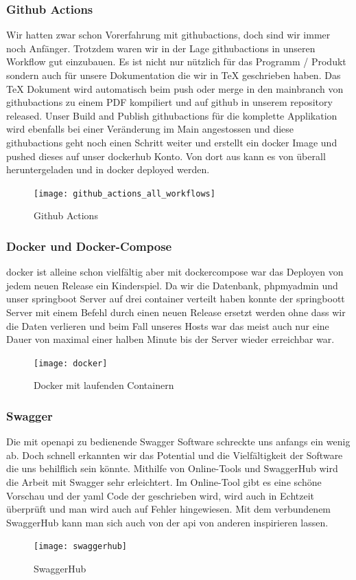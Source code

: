 \documentclass[../main.tex]{subfiles}
\begin{document}
	\subsubsection{Github Actions}
	Wir hatten zwar schon Vorerfahrung mit \gls{githubactions}, doch sind wir immer noch Anfänger. Trotzdem waren wir in der Lage \gls{githubactions} in unseren Workflow gut einzubauen. Es ist nicht nur nützlich für das Programm / Produkt sondern auch für unsere Dokumentation die wir in TeX geschrieben haben. Das TeX Dokument wird automatisch beim \gls{push} oder \gls{merge} in den \gls{mainbranch} von \gls{githubactions} zu einem PDF kompiliert und auf \gls{github} in unserem \gls{repository} released. Unser Build and Publish \gls{githubactions} für die komplette Applikation wird ebenfalls bei einer Veränderung im Main angestossen und diese \gls{githubactions} geht noch einen Schritt weiter und erstellt ein \gls{docker} Image und pushed dieses auf unser \gls{dockerhub} Konto. Von dort aus kann es von überall heruntergeladen und in \gls{docker} deployed werden.
	\begin{figure}[H]
		\centering
		\texttt{[image: github\_actions\_all\_workflows]} 
		\caption{Github Actions}
		\label{fig:github_actions_all_workflows}
	\end{figure}
	
	\subsubsection{Docker und Docker-Compose}
	\gls{docker} ist alleine schon vielfältig aber mit \gls{dockercompose} war das Deployen von jedem neuen Release ein Kinderspiel. Da wir die Datenbank, \gls{phpmyadmin} und unser \gls{springboot} Server auf drei \gls{container} verteilt haben konnte der \gls{springboot}t Server mit einem Befehl durch einen neuen Release ersetzt werden ohne dass wir die Daten verlieren und beim Fall unseres Hosts war das meist auch nur eine Dauer von maximal einer halben Minute bis der Server wieder erreichbar war.
	\begin{figure}[H]
		\centering
		\texttt{[image: docker]} 
		\caption{Docker mit laufenden Containern}
		\label{fig:docker}
	\end{figure}
	
	\subsubsection{Swagger}
	Die mit \gls{openapi} zu bedienende Swagger Software schreckte uns anfangs ein wenig ab. Doch schnell erkannten wir das Potential und die Vielfältigkeit der Software die uns behilflich sein könnte. Mithilfe von Online-Tools und SwaggerHub wird die Arbeit mit Swagger sehr erleichtert. Im Online-Tool gibt es eine schöne Vorschau und der \gls{yaml} Code der geschrieben wird, wird auch in Echtzeit überprüft und man wird auch auf Fehler hingewiesen. Mit dem verbundenem SwaggerHub kann man sich auch von der \gls{api} von anderen inspirieren lassen.
		\begin{figure}[H]
		\centering
		\texttt{[image: swaggerhub]} 
		\caption{SwaggerHub}
		\label{fig:swaggerhub}
	\end{figure}
	
\end{document}
